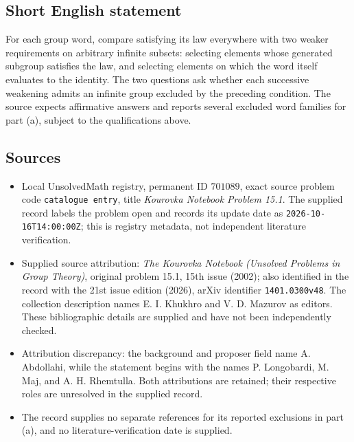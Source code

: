 \documentclass[11pt]{article}
\begin{document}
\subsection{Short English statement}
For each group word, compare satisfying its law everywhere with two weaker requirements on arbitrary infinite subsets: selecting elements whose generated subgroup satisfies the law, and selecting elements on which the word itself evaluates to the identity. The two questions ask whether each successive weakening admits an infinite group excluded by the preceding condition. The source expects affirmative answers and reports several excluded word families for part (a), subject to the qualifications above.
\subsection{Sources}
\begin{itemize}
\item Local UnsolvedMath registry, permanent ID \(701089\), exact source problem code \texttt{catalogue entry}, title \emph{Kourovka Notebook Problem 15.1}. The supplied record labels the problem open and records its update date as \texttt{2026-10-16T14:00:00Z}; this is registry metadata, not independent literature verification.
\item Supplied source attribution: \emph{The Kourovka Notebook (Unsolved Problems in Group Theory)}, original problem 15.1, 15th issue (2002); also identified in the record with the 21st issue edition (2026), arXiv identifier \texttt{1401.0300v48}. The collection description names E. I. Khukhro and V. D. Mazurov as editors. These bibliographic details are supplied and have not been independently checked.
\item Attribution discrepancy: the background and proposer field name A. Abdollahi, while the statement begins with the names P. Longobardi, M. Maj, and A. H. Rhemtulla. Both attributions are retained; their respective roles are unresolved in the supplied record.
\item The record supplies no separate references for its reported exclusions in part (a), and no literature-verification date is supplied.
\end{itemize}
\end{document}
